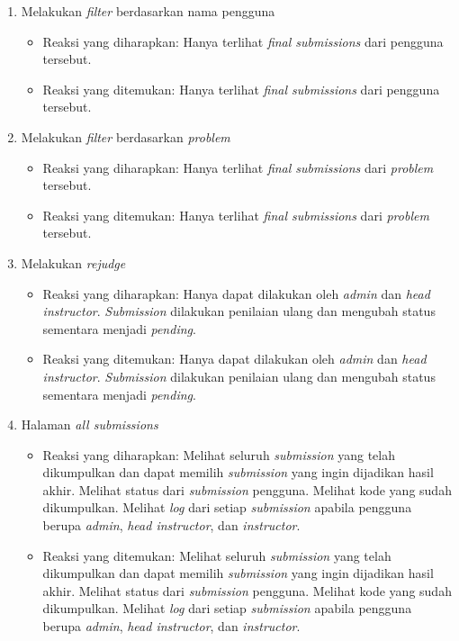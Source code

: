 \begin{enumerate}
\begin{itemize}
	 \end{itemize}
	 \item Melakukan \textit{filter} berdasarkan nama pengguna
	 \begin{itemize}
	 	\item Reaksi yang diharapkan: Hanya terlihat \textit{final submissions} dari pengguna tersebut.
	 	\item Reaksi yang ditemukan: Hanya terlihat \textit{final submissions} dari pengguna tersebut.
	 \end{itemize}
	 \item Melakukan \textit{filter} berdasarkan \textit{problem}
	 \begin{itemize}
	 	\item Reaksi yang diharapkan: Hanya terlihat \textit{final submissions} dari \textit{problem} tersebut.
	 	\item Reaksi yang ditemukan: Hanya terlihat \textit{final submissions} dari \textit{problem} tersebut.
	 \end{itemize}
	 \item Melakukan \textit{rejudge}
	 \begin{itemize}
	 	\item Reaksi yang diharapkan: Hanya dapat dilakukan oleh \textit{admin} dan \textit{head instructor}. \textit{Submission} dilakukan penilaian ulang dan mengubah status sementara menjadi \textit{pending}.
	 	\item Reaksi yang ditemukan: Hanya dapat dilakukan oleh \textit{admin} dan \textit{head instructor}. \textit{Submission} dilakukan penilaian ulang dan mengubah status sementara menjadi \textit{pending}.
	 \end{itemize}
	 \item Halaman \textit{all submissions}
	 \begin{itemize}
	 	\item Reaksi yang diharapkan: Melihat seluruh \textit{submission} yang telah dikumpulkan dan dapat memilih \textit{submission} yang ingin dijadikan hasil akhir. Melihat status dari \textit{submission} pengguna. Melihat kode yang sudah dikumpulkan. Melihat \textit{log} dari setiap \textit{submission} apabila pengguna berupa \textit{admin}, \textit{head instructor}, dan \textit{instructor}.
	 	\item Reaksi yang ditemukan: Melihat seluruh \textit{submission} yang telah dikumpulkan dan dapat memilih \textit{submission} yang ingin dijadikan hasil akhir. Melihat status dari \textit{submission} pengguna. Melihat kode yang sudah dikumpulkan. Melihat \textit{log} dari setiap \textit{submission} apabila pengguna berupa \textit{admin}, \textit{head instructor}, dan \textit{instructor}.

\end{itemize}
\end{enumerate}
